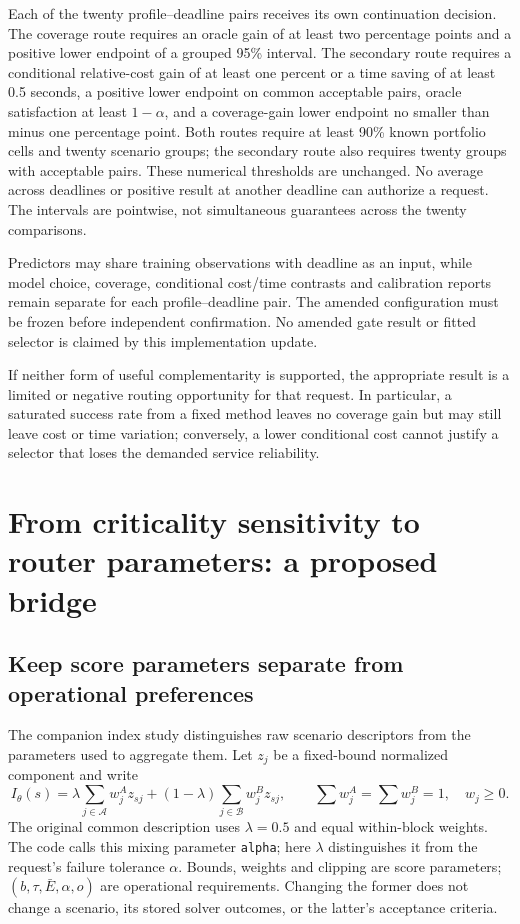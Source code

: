 Each of the twenty profile--deadline pairs receives its own continuation
decision. The coverage route requires an oracle gain of at least two
percentage points and a positive lower endpoint of a grouped 95\% interval.
The secondary route requires a conditional relative-cost gain of at least
one percent or a time saving of at least 0.5 seconds, a positive lower
endpoint on common acceptable pairs, oracle satisfaction at least
$1-\alpha$, and a coverage-gain lower endpoint no smaller than minus one
percentage point. Both routes require at least 90\% known portfolio cells
and twenty scenario groups; the secondary route also requires twenty groups
with acceptable pairs. These numerical thresholds are unchanged.
No average across deadlines or positive result at another deadline can
authorize a request. The intervals are pointwise, not simultaneous
guarantees across the twenty comparisons.

Predictors may share training observations with deadline as an input, while
model choice, coverage, conditional cost/time contrasts and calibration
reports remain separate for each profile--deadline pair. The amended
configuration must be frozen before independent confirmation. No amended
gate result or fitted selector is claimed by this implementation update.

If neither form of useful complementarity is supported, the appropriate result
is a limited or negative routing opportunity for that request. In particular,
a saturated success rate from a fixed method leaves no coverage gain but may
still leave cost or time variation; conversely, a lower conditional cost
cannot justify a selector that loses the demanded service reliability.

\section{From criticality sensitivity to router parameters: a proposed bridge}
\subsection{Keep score parameters separate from operational preferences}
The companion index study distinguishes raw scenario descriptors from the
parameters used to aggregate them. Let $z_j$ be a fixed-bound normalized
component and write
\begin{equation}
 I_{\theta}(s)=\lambda\sum_{j\in\mathcal A}w^A_jz_{sj}
 +(1-\lambda)\sum_{j\in\mathcal B}w^B_jz_{sj},
 \qquad \sum w^A_j=\sum w^B_j=1,\quad w_j\geq0.
 \label{eq:router_index}
\end{equation}
The original common description uses $\lambda=0.5$ and equal within-block
weights. The code calls this mixing parameter \texttt{alpha}; here
$\lambda$ distinguishes it from the request's failure tolerance $\alpha$.
Bounds, weights and clipping are score parameters; $(b,\tau,\bar E,\alpha,o)$
are operational requirements. Changing the former does not change a scenario,
its stored solver outcomes, or the latter's acceptance criteria.

